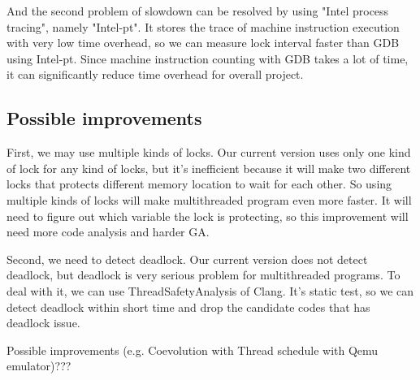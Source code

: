 And the second problem of slowdown can be resolved by using "Intel process tracing", namely "Intel-pt". It stores the trace of machine instruction execution with very low time overhead, so we can measure lock interval faster than GDB using Intel-pt. Since machine instruction counting with GDB takes a lot of time, it can significantly reduce time overhead for overall project.

\subsection{Possible improvements}
First, we may use multiple kinds of locks. Our current version uses only one kind of lock for any kind of locks, but it's inefficient because it will make two different locks that protects different memory location to wait for each other. So using multiple kinds of locks will make multithreaded program even more faster. It will need to figure out which variable the lock is protecting, so this improvement will need more code analysis and harder GA.

Second, we need to detect deadlock. Our current version does not detect deadlock, but deadlock is very serious problem for multithreaded programs. To deal with it, we can use ThreadSafetyAnalysis of Clang. It's static test, so we can detect deadlock within short time and drop the candidate codes that has deadlock issue.

Possible improvements (e.g. Coevolution with Thread schedule with Qemu emulator)???
